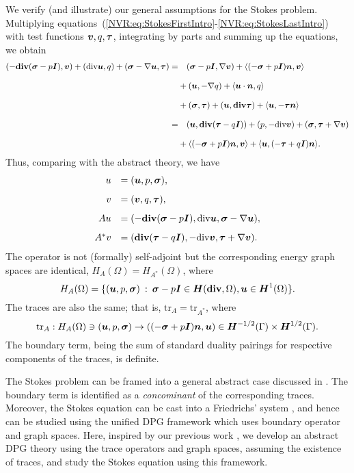 We verify (and illustrate) our general assumptions for the Stokes problem.
Multiplying equations~(\ref{NVR:eq:StokesFirstIntro}-\ref{NVR:eq:StokesLastIntro}) with test functions $\bfv,q,\bftau$, integrating by parts
and summing up the equations, we obtain
\begin{align*}
(- \text{\bf div} ( \bfsig - p \bfI ),\bfv)+
(\text{div} \bfu,q)+
(\bfsig  - \bfnab \bfu,\bftau)
=& \quad ( \bfsig - p \bfI, \bfnab \bfv) + \langle  (- \bfsig + p \bfI) \bfn, \bfv\rangle\\[8pt] 
&+ (\bfu, - \bfnab q) + \langle  \bfu \cdot \bfn,q\rangle\\[8pt]
&+ (\bfsig,\bftau) + (\bfu, \text{\bf div} \bftau) + \langle \bfu, - \bftau \bfn\rangle\\[8pt] 
=& \quad (\bfu, {\bf div} (\bftau - q \bfI)) + (p, - \text{div} \bfv) + (\bfsig, \bftau + \bfnab \bfv) \\[8pt]
&+ \langle  (- \bfsig + p \bfI) \bfn, \bfv\rangle + \langle \bfu, (-\bftau + q\bfI) \bfn\rangle.
\end{align*}
Thus, comparing with the abstract theory, we have
\[
\begin{array}{rl}
u & = (\bfu,p,\bfsig), \\[8pt]
v & = (\bfv,q,\bftau), \\[8pt]
Au & = (- \text{\bf div} ( \bfsig - p \bfI ),\text{div} \bfu,\bfsig  - \bfnab \bfu), \\[8pt]
A^\ast v & = (\text{\bf div} (\bftau - q \bfI) ,- \text{div} \bfv,\bftau + \bfnab \bfv ).
\end{array}
\]
The operator is not (formally) self-adjoint but the corresponding energy graph spaces are identical,
$H_A(\Omega) = H_{A^\ast}(\Omega)$, where
\[
H_A(\Omega) = \{ (\bfu,p,\bfsig) \: : \: \bfsig - p\bfI \in
\bfH(\text{\bf div},\Omega), \bfu \in \bfH^1(\Omega) \}.
\]
The traces are also the same; that is, $\text{tr}_A = \text{tr}_{A^\ast}$, where 
\[
\text{tr}_A : H_A(\Omega) \ni (\bfu,p,\bfsig) \to ((-\bfsig + p \bfI)
\bfn, \bfu) \in \bfH^{-1/2}(\Gamma) \times \bfH^{1/2}(\Gamma).
\]
The
boundary term, being the sum of standard duality pairings for
respective components of the traces, is definite. 

\begin{remark}
The Stokes problem can be framed into a general abstract case
discussed in \cite[Section 6.6]{FAbook}.  The boundary term is
identified as a {\em concominant} of the corresponding
traces. Moreover, the Stokes equation can be cast into a Friedrichs'
system \cite{ErnGuermond08}, and hence can be studied using the
unified DPG framework \cite{Bui-ThanhDemkowiczGhattas11b} which uses
boundary operator and graph spaces. Here, inspired by our previous work
\cite{Bui-ThanhDemkowiczGhattas11b}, we develop an abstract
DPG theory using the trace operators and graph spaces, assuming the existence of
traces, and study the Stokes equation using this framework.
\end{remark}


